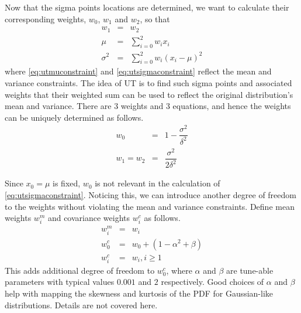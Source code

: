 Now that the sigma points locations are determined, we want to calculate their corresponding weights, $w_0$, $w_1$ and $w_2$, so that
\begin{eqnarray}
	w_1 &=& w_2 \nonumber \\
	\mu &=& \sum_{i=0}^{2} w_i x_i \label{eq:utmuconstraint} \\
	\sigma^2 &=& \sum_{i=0}^{2} w_i\left(x_i - \mu\right)^2 \label{eq:utsigmaconstraint}
\end{eqnarray}
where \eqref{eq:utmuconstraint} and \eqref{eq:utsigmaconstraint} reflect the mean and variance constraints. The idea of UT is to find such sigma points and associated weights that their weighted sum can be used to reflect the original distribution's mean and variance. There are 3 weights and 3 equations, and hence the weights can be uniquely determined as follows.
\begin{eqnarray}
	w_0 &=& 1- \dfrac{\sigma^2}{\delta^2} \nonumber \\
	w_1 = w_2 &=& \dfrac{\sigma^2}{2\delta^2} \nonumber
\end{eqnarray} 

Since $x_0=\mu$ is fixed, $w_0$ is not relevant in the calculation of \eqref{eq:utsigmaconstraint}. Noticing this, we can introduce another degree of freedom to the weights without violating the mean and variance constraints. Define mean weights $w_i^m$ and covariance weights $w_i^c$ as follows.
\begin{eqnarray}
	w_i^m &=& w_i \nonumber \\
	w_0^c &=& w_0 + (1 - \alpha^2 + \beta) \nonumber \\
	w_i^c &=& w_i, i\geq 1 \nonumber
\end{eqnarray} 
This adds additional degree of freedom to $w_0^c$, where $\alpha$ and $\beta$ are tune-able parameters with typical values $0.001$ and $2$ respectively. Good choices of $\alpha$ and $\beta$ help with mapping the skewness and kurtosis of the PDF for Gaussian-like distributions. Details are not covered here.

